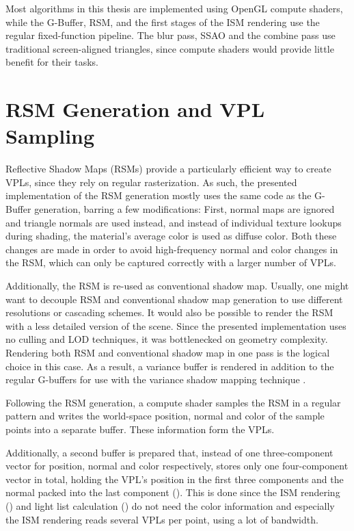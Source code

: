 Most algorithms in this thesis are implemented using OpenGL compute shaders, while the G-Buffer, RSM, and the first stages of the ISM rendering use the regular fixed-function pipeline. The blur pass, SSAO and the combine pass use traditional screen-aligned triangles, since compute shaders would provide little benefit for their tasks.


\section{RSM Generation and VPL Sampling}
\label{sec:impl:rsmAndVplSampling}

Reflective Shadow Maps (RSMs) provide a particularly efficient way to create VPLs, since they rely on regular rasterization. As such, the presented implementation of the RSM generation mostly uses the same code as the G-Buffer generation, barring a few modifications: First, normal maps are ignored and triangle normals are used instead, and instead of individual texture lookups during shading, the material's average color is used as diffuse color. Both these changes are made in order to avoid high-frequency normal and color changes in the RSM, which can only be captured correctly with a larger number of VPLs.

Additionally, the RSM is re-used as conventional shadow map. Usually, one might want to decouple RSM and conventional shadow map generation to use different resolutions or cascading schemes. It would also be possible to render the RSM with a less detailed version of the scene. Since the presented implementation uses no culling and LOD techniques, it was bottlenecked on geometry complexity. Rendering both RSM and conventional shadow map in one pass is the logical choice in this case. As a result, a variance buffer is rendered in addition to the regular G-buffers for use with the variance shadow mapping technique \citep{Donnelly:2006:VSM}.

Following the RSM generation, a compute shader samples the RSM in a regular pattern and writes the world-space position, normal and color of the sample points into a separate buffer. These information form the VPLs.

Additionally, a second buffer is prepared that, instead of one three-component vector for position, normal and color respectively, stores only one four-component vector in total, holding the VPL's position in the first three components and the normal packed into the last component (\citet{Cigolle:2014:NormalPacking}). This is done since the ISM rendering () and light list calculation () do not need the color information and especially the ISM rendering reads several VPLs per point, using a lot of bandwidth.

